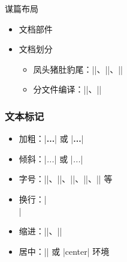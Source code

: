 \begin{frame}[fragile]{谋篇布局}
    \begin{itemize}
        \item 文档部件


        \item 文档划分

              \begin{itemize}
                  \item 凤头猪肚豹尾：|\frontmatter|、|\mainmatter|、|\backmatter|
                  \item 分文件编译：||、||
              \end{itemize}
    \end{itemize}
\end{frame}

\begin{frame}[fragile]
    \frametitle{文本标记}
    \begin{itemize}
        \item 加粗：|{\bfseries ...}| 或 |\textbf{...}|
        \item 倾斜：|{\itshape ...}| 或 |\textit{...}|
        \item 字号：|\tiny|、|\small|、|\normalsize|、|\large|、|\huge| 等
        \item 换行：|\\|
        \item 缩进：|\indent|、|\noindent|
        \item 居中：|\centering| 或 |center| 环境
    \end{itemize}
\end{frame}


